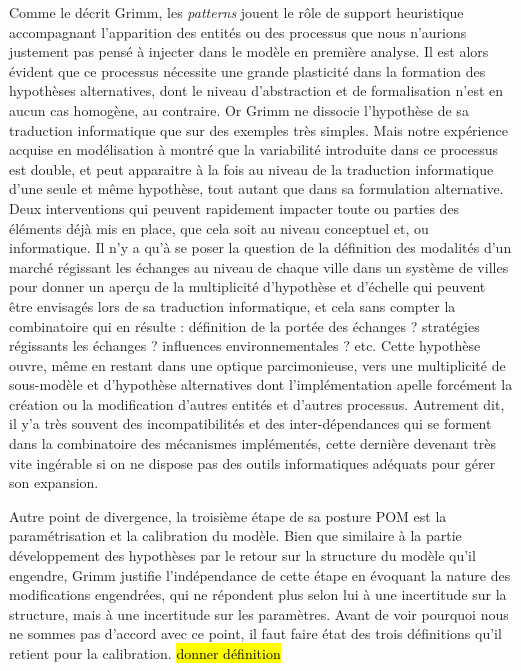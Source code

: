 Comme le décrit Grimm, les \textit{patterns} jouent le rôle de support heuristique accompagnant l'apparition des entités ou des processus que nous n'aurions justement pas pensé à injecter dans le modèle en première analyse. Il est alors évident que ce processus nécessite une grande plasticité dans la formation des hypothèses alternatives, dont le niveau d'abstraction et de formalisation n'est en aucun cas homogène, au contraire. Or Grimm ne dissocie l'hypothèse de sa traduction informatique que sur des exemples très simples. Mais notre expérience acquise en modélisation à montré que la variabilité introduite dans ce processus est double, et peut apparaitre à la fois au niveau de la traduction informatique d'une seule et même hypothèse, tout autant que dans sa formulation alternative. Deux interventions qui peuvent rapidement impacter toute ou parties des éléments déjà mis en place, que cela soit au niveau conceptuel et, ou informatique. Il n'y a qu'à se poser la question de la définition des modalités d'un marché régissant les échanges au niveau de chaque ville dans un système de villes pour donner un aperçu de la multiplicité d'hypothèse et d'échelle qui peuvent être envisagés lors de sa traduction informatique, et cela sans compter la combinatoire qui en résulte : définition de la portée des échanges ? stratégies régissants les échanges ? influences environnementales ? etc. Cette hypothèse ouvre, même en restant dans une optique parcimonieuse, vers une multiplicité de sous-modèle et d'hypothèse alternatives dont l'implémentation apelle forcément la création ou la modification d'autres entités et d'autres processus. Autrement dit, il y'a très souvent des incompatibilités et des inter-dépendances qui se forment dans la combinatoire des mécanismes implémentés, cette dernière devenant très vite ingérable si on ne dispose pas des outils informatiques adéquats pour gérer son expansion. 

Autre point de divergence, la troisième étape de sa posture POM est la paramétrisation et la calibration du modèle. Bien que similaire à la partie développement des hypothèses par le retour sur la structure du modèle qu'il engendre, Grimm justifie l'indépendance de cette étape en évoquant la nature des modifications engendrées, qui ne répondent plus selon lui à une incertitude sur la structure, mais à une incertitude sur les paramètres. Avant de voir pourquoi nous ne sommes pas d'accord avec ce point, il faut faire état des trois définitions qu'il retient pour la calibration. \hl{donner définition}

